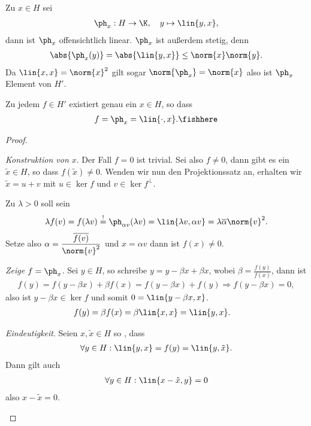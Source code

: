 \begin{bem}
\label{bem:5.15}
Zu $x\in H$ sei
\begin{align*}
\ph_x : H\to \K,\quad y\mapsto \lin{y,x},
\end{align*}
dann ist $\ph_x$ offensichtlich linear. $\ph_x$ ist außerdem stetig, denn
\begin{align*}
\abs{\ph_x(y)} = \abs{\lin{y,x}}\le \norm{x}\norm{y}.
\end{align*}
Da $\lin{x,x}=\norm{x}^2$ gilt sogar $\norm{\ph_x}=\norm{x}$ also ist 
$\ph_x$ Element von $H'$.\maphere
\end{bem}

\begin{lem}
\label{prop:5.16}
Zu jedem $f\in H'$ existiert genau ein $x\in H$, so dass
\begin{align*}
f = \ph_x =  \lin{\cdot,x}.\fishhere
\end{align*} 
\end{lem}
\begin{proof}
\begin{proofenum}
  \item \textit{Konstruktion von $x$}. Der Fall $f=0$ ist trivial. Sei also
  $f\neq 0$, dann gibt es ein $\tilde{x}\in H$, so dass $f(\tilde{x})\neq 0$.
  Wenden wir nun den Projektionssatz an, erhalten wir $\tilde{x}=u+v$ mit
  $u\in\ker f$ und $v\in \ker f^\bot$.
  
  Zu $\lambda > 0$ soll sein
  \begin{align*}
  \lambda f(v) = f(\lambda v) \overset{!}{=}\ph_{\alpha v}(\lambda v) =
  \lin{\lambda v,\alpha v} = \lambda\overline{\alpha}\norm{v}^2.
  \end{align*}
Setze also $\alpha = \dfrac{\overline{f(v)}}{\norm{v}^2}$ und $x=\alpha v$ dann
ist $f(x)\neq 0$.

\item\textit{Zeige $f=\ph_x$}. Sei $y\in H$, so schreibe $y=y-\beta x+ \beta x$,
wobei $\beta = \frac{f(y)}{f(x)}$, dann ist
\begin{align*}
f(y) = f(y-\beta x) + \beta f(x) = f(y-\beta x) + f(y) \Rightarrow f(y-\beta x)
= 0,
\end{align*}
also ist $y-\beta x\in \ker f$ und somit $0=\lin{y-\beta x,x}$.
\begin{align*}
f(y) &= \beta f(x) = \beta\lin{x,x} = \lin{y,x}.
\end{align*}
\item\textit{Eindeutigkeit}. Seien $x,\tilde{x}\in H$ so , dass
\begin{align*}
\forall y\in H : \lin{y,x} = f(y) = \lin{y,\tilde{x}}.
\end{align*}
Dann gilt auch
\begin{align*}
\forall y\in H : \lin{x-\tilde{x},y} = 0
\end{align*}
also $x-\tilde{x}=0$.\qedhere
\end{proofenum}
\end{proof}

